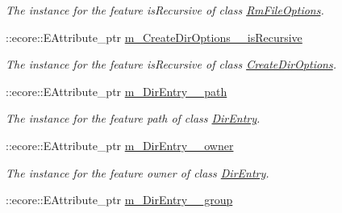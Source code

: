 \begin{DoxyCompactItemize}
\begin{DoxyCompactList}\small\item\em The instance for the feature isRecursive of class \hyperlink{classFMS__Data_1_1RmFileOptions}{RmFileOptions}. \item\end{DoxyCompactList}\item 
\hypertarget{classFMS__Data_1_1FMS__DataPackage_a3b5d677c55e8a7f95eead61d497b1bfe}{
::ecore::EAttribute\_\-ptr \hyperlink{classFMS__Data_1_1FMS__DataPackage_a3b5d677c55e8a7f95eead61d497b1bfe}{m\_\-CreateDirOptions\_\-\_\-isRecursive}}
\label{classFMS__Data_1_1FMS__DataPackage_a3b5d677c55e8a7f95eead61d497b1bfe}

\begin{DoxyCompactList}\small\item\em The instance for the feature isRecursive of class \hyperlink{classFMS__Data_1_1CreateDirOptions}{CreateDirOptions}. \item\end{DoxyCompactList}\item 
\hypertarget{classFMS__Data_1_1FMS__DataPackage_a816b40cbc0c56a6a5622cbc51320d332}{
::ecore::EAttribute\_\-ptr \hyperlink{classFMS__Data_1_1FMS__DataPackage_a816b40cbc0c56a6a5622cbc51320d332}{m\_\-DirEntry\_\-\_\-path}}
\label{classFMS__Data_1_1FMS__DataPackage_a816b40cbc0c56a6a5622cbc51320d332}

\begin{DoxyCompactList}\small\item\em The instance for the feature path of class \hyperlink{classFMS__Data_1_1DirEntry}{DirEntry}. \item\end{DoxyCompactList}\item 
\hypertarget{classFMS__Data_1_1FMS__DataPackage_a4fc6c2c965b1e35c267fb7b1d53ec8be}{
::ecore::EAttribute\_\-ptr \hyperlink{classFMS__Data_1_1FMS__DataPackage_a4fc6c2c965b1e35c267fb7b1d53ec8be}{m\_\-DirEntry\_\-\_\-owner}}
\label{classFMS__Data_1_1FMS__DataPackage_a4fc6c2c965b1e35c267fb7b1d53ec8be}

\begin{DoxyCompactList}\small\item\em The instance for the feature owner of class \hyperlink{classFMS__Data_1_1DirEntry}{DirEntry}. \item\end{DoxyCompactList}\item 
\hypertarget{classFMS__Data_1_1FMS__DataPackage_a3950a08da89e21b2bf027fb2438b844e}{
::ecore::EAttribute\_\-ptr \hyperlink{classFMS__Data_1_1FMS__DataPackage_a3950a08da89e21b2bf027fb2438b844e}{m\_\-DirEntry\_\-\_\-group}}
\label{classFMS__Data_1_1FMS__DataPackage_a3950a08da89e21b2bf027fb2438b844e}


\end{DoxyCompactItemize}
